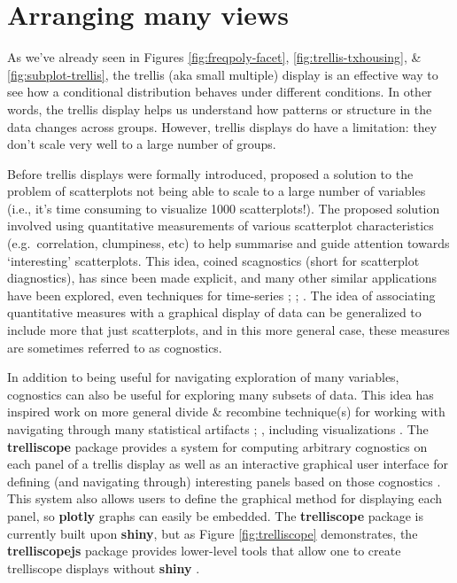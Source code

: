 \documentclass[
  12pt,
]{krantz}
\begin{document}
\hypertarget{navigating-many-views}{%
\section{Arranging many views}\label{navigating-many-views}}

As we've already seen in Figures \ref{fig:freqpoly-facet}, \ref{fig:trellis-txhousing}, \& \ref{fig:subplot-trellis}, the trellis (aka small multiple) display is an effective way to see how a conditional distribution behaves under different conditions. In other words, the trellis display helps us understand how patterns or structure in the data changes across groups. However, trellis displays do have a limitation: they don't scale very well to a large number of groups.

Before trellis displays were formally introduced, \citet{scagnostics-tukey} proposed a solution to the problem of scatterplots not being able to scale to a large number of variables (i.e., it's time consuming to visualize 1000 scatterplots!). The proposed solution involved using quantitative measurements of various scatterplot characteristics (e.g.~correlation, clumpiness, etc) to help summarise and guide attention towards `interesting' scatterplots. This idea, coined scagnostics (short for scatterplot diagnostics), has since been made explicit, and many other similar applications have been explored, even techniques for time-series \citep{Wilkinson:2005b}; \citep{Wilkinson:2008}; \citep{Wilkinson:2012}. The idea of associating quantitative measures with a graphical display of data can be generalized to include more that just scatterplots, and in this more general case, these measures are sometimes referred to as cognostics.

In addition to being useful for navigating exploration of many variables, cognostics can also be useful for exploring many subsets of data. This idea has inspired work on more general divide \& recombine technique(s) for working with navigating through many statistical artifacts \citep{divide-recombine}; \citep{RHIPE}, including visualizations \citep{trelliscope}. The \textbf{trelliscope} package provides a system for computing arbitrary cognostics on each panel of a trellis display as well as an interactive graphical user interface for defining (and navigating through) interesting panels based on those cognostics \citep{trelliscope-pkg}. This system also allows users to define the graphical method for displaying each panel, so \textbf{plotly} graphs can easily be embedded. The \textbf{trelliscope} package is currently built upon \textbf{shiny}, but as Figure \ref{fig:trelliscope} demonstrates, the \textbf{trelliscopejs} package provides lower-level tools that allow one to create trelliscope displays without \textbf{shiny} \citep{trelliscopejs}.
\end{document}
